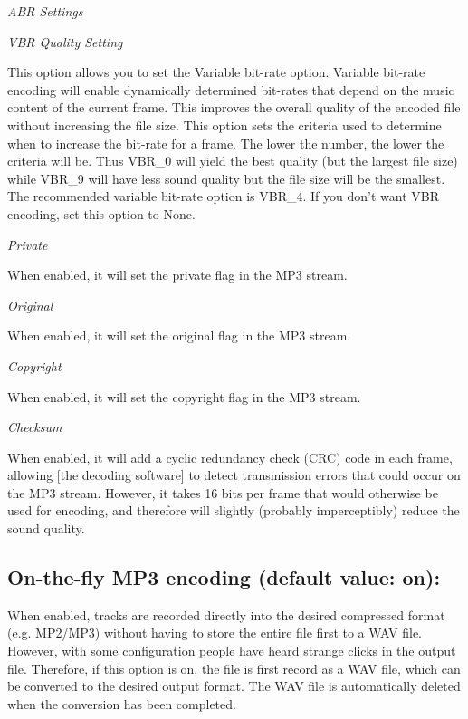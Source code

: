 {\it ABR Settings}


{\it VBR Quality Setting}

This option allows you to set the Variable bit-rate option.
Variable bit-rate encoding will enable dynamically determined bit-rates that
depend on the music content of the current frame. This improves the overall quality
of the encoded file without increasing the file size. This option sets the
criteria used to determine when to increase the bit-rate for a frame. The lower
the number, the lower the criteria will be. Thus VBR_0 will yield the best quality
(but the largest file size) while VBR_9 will have less sound quality but the file size
will be the smallest. The recommended variable bit-rate option is VBR_4. If you don't
want VBR encoding, set this option to None.



{\it Private}

When enabled, it will set the private flag in the MP3 stream.

{\it Original}

When enabled, it will set the original flag in the MP3 stream.

{\it Copyright}

When enabled, it will set the copyright flag in the MP3 stream.

{\it Checksum}

When enabled, it will add a cyclic redundancy check (CRC) code in each frame, allowing 
[the decoding software] to detect transmission errors that could occur on the MP3 stream.
However, it takes 16 bits per frame that would otherwise be used for encoding, and therefore
will slightly (probably imperceptibly) reduce the sound quality.

\subsection{On-the-fly MP3 encoding (default value: on):}\label{otfencoding}


When enabled, tracks are recorded directly into the desired compressed format
(e.g. MP2/MP3) without having to store the entire file first to a WAV file.
However, with some configuration people have heard strange clicks in the
output file. Therefore, if this option is on, the file is first record as a WAV file, which can be
converted to the desired output format. The WAV file is automatically deleted
when the conversion has been completed. 

